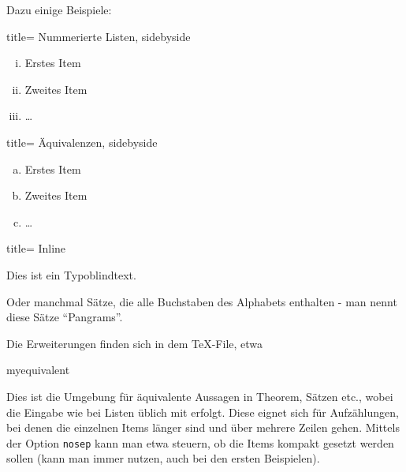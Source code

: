 Dazu einige Beispiele: 
%
\begin{tcblisting}{title= Nummerierte Listen, sidebyside }
\begin{enumerate}[(i)]
\item
Erstes Item
\item
Zweites Item
\item
\ldots
\end{enumerate}
\end{tcblisting}
%
\begin{tcblisting}{title= Äquivalenzen, sidebyside }
\begin{enumerate}[(a)]
\item
Erstes Item
\item
Zweites Item
\item
\ldots
\end{enumerate}
\end{tcblisting}
%
\begin{tcblisting}{title= Inline}
\begin{enumerate*}[(1)]
\item
Dies ist ein Typoblindtext. 

\item
Oder manchmal Sätze, die alle Buchstaben des Alphabets enthalten - man nennt diese Sätze \enquote{Pangrams}. 

\end{enumerate*}
\end{tcblisting}
%
Die Erweiterungen finden sich in dem \og \TeX{}-File, etwa
%
\begin{docEnvironment}{myequivalent}{}
\end{docEnvironment}
%
Dies ist die Umgebung für äquivalente Aussagen in Theorem, Sätzen etc., wobei die Eingabe wie bei Listen üblich mit  erfolgt.
Diese eignet sich für Aufzählungen, bei denen die einzelnen Items länger sind und über mehrere Zeilen gehen.
Mittels der Option \texttt{nosep} kann man etwa steuern, ob die Items kompakt gesetzt werden sollen (kann man immer nutzen, auch bei den ersten Beispielen).

